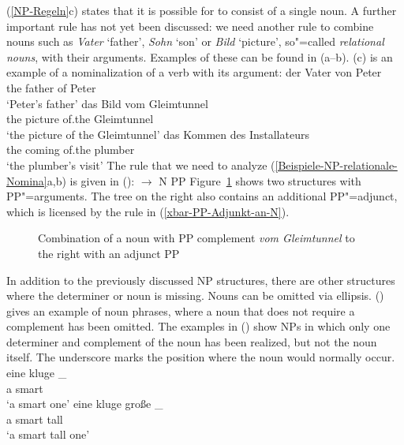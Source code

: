 (\ref{NP-Regeln}c) states that it is possible for \nbar to consist of a single noun. A further important rule has not yet been
discussed: we need another rule to combine nouns such as \emph{Vater} `father', \emph{Sohn} `son' or \emph{Bild} `picture', 
so"=called \emph{relational nouns}, with their arguments. Examples of these can be found in (a--b).
(c) is an example of a nominalization of a verb with its argument:
\eal
\label{Beispiele-NP-relationale-Nomina}
\ex 
\gll der Vater von Peter\\
	 the father of Peter\\
\glt `Peter's father'
\ex 
\gll das Bild vom Gleimtunnel\\
	 the picture of.the Gleimtunnel\\
\glt `the picture of the Gleimtunnel'
\ex 
\gll das Kommen des Installateurs\\
	 the coming of.the plumber\\
\glt `the plumber's visit'
\zl
\noindent
The rule that we need to analyze (\ref{Beispiele-NP-relationale-Nomina}a,b) is given in
():
\ea
\nbar $\to$ N PP
\z
%
Figure~\ref{Abbildung-NP-mit-PP-Argument} shows two structures with PP"=arguments. The tree on the right also contains an additional PP"=adjunct, which is licensed
by the rule in (\ref{xbar-PP-Adjunkt-an-N}).
\begin{figure}
\caption{\label{Abbildung-NP-mit-PP-Argument}Combination of a noun with PP complement
  \emph{vom Gleimtunnel} to the right with an adjunct PP}
\end{figure}%


In addition to the previously discussed NP structures, there are other structures where the determiner or noun is missing.
Nouns can be omitted via ellipsis. () gives an example of noun phrases, where a noun that does not require a complement
has been omitted. The examples in () show NPs in which only one determiner and complement of the noun has been realized,
but not the noun itself. The underscore marks the position where the noun would normally occur. 
\eal
\label{ex-nounless-np}
\ex 
\gll eine kluge \_\\
	 a smart\\
\glt `a smart one'
\ex 
\gll eine kluge große \_\\
     a    smart tall\\
\glt `a smart tall one'

